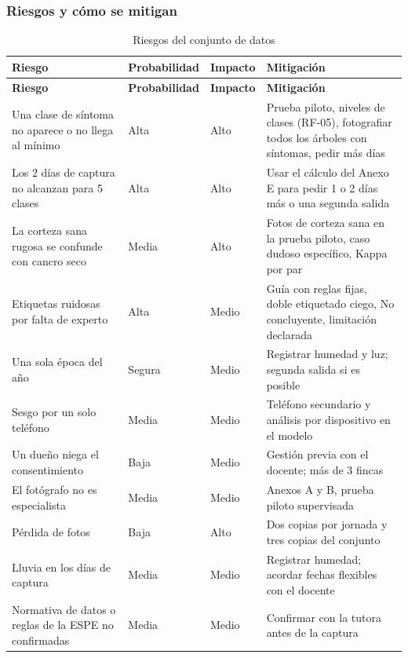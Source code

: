\documentclass[11pt]{article}
\begin{document}
\subsubsection{Riesgos y cómo se mitigan}
{\small
\begin{longtable}{|>{\RaggedRight\arraybackslash}p{4.73cm}|>{\RaggedRight\arraybackslash}p{1.89cm}|>{\RaggedRight\arraybackslash}p{1.51cm}|>{\RaggedRight\arraybackslash}p{6.24cm}|}
\caption{Riesgos del conjunto de datos}\\
\hline
\rowcolor{encabezado}\textbf{Riesgo} & \textbf{Probabilidad} & \textbf{Impacto} & \textbf{Mitigación} \\ \hline
\endfirsthead
\hline
\rowcolor{encabezado}\textbf{Riesgo} & \textbf{Probabilidad} & \textbf{Impacto} & \textbf{Mitigación} \\ \hline
\endhead
Una clase de síntoma no aparece o no llega al mínimo & Alta & Alto & Prueba piloto, niveles de clases (RF-05), fotografiar todos los árboles con síntomas, pedir más días \\ \hline
Los 2 días de captura no alcanzan para 5 clases & Alta & Alto & Usar el cálculo del Anexo E para pedir 1 o 2 días más o una segunda salida \\ \hline
La corteza sana rugosa se confunde con cancro seco & Media & Alto & Fotos de corteza sana en la prueba piloto, caso dudoso específico, Kappa por par \\ \hline
Etiquetas ruidosas por falta de experto & Alta & Medio & Guía con reglas fijas, doble etiquetado ciego, No concluyente, limitación declarada \\ \hline
Una sola época del año & Segura & Medio & Registrar humedad y luz; segunda salida si es posible \\ \hline
Sesgo por un solo teléfono & Media & Medio & Teléfono secundario y análisis por dispositivo en el modelo \\ \hline
Un dueño niega el consentimiento & Baja & Medio & Gestión previa con el docente; más de 3 fincas \\ \hline
El fotógrafo no es especialista & Media & Medio & Anexos A y B, prueba piloto supervisada \\ \hline
Pérdida de fotos & Baja & Alto & Dos copias por jornada y tres copias del conjunto \\ \hline
Lluvia en los días de captura & Media & Medio & Registrar humedad; acordar fechas flexibles con el docente \\ \hline
Normativa de datos o reglas de la ESPE no confirmadas & Media & Medio & Confirmar con la tutora antes de la captura \\ \hline
\end{longtable}}
\end{document}
